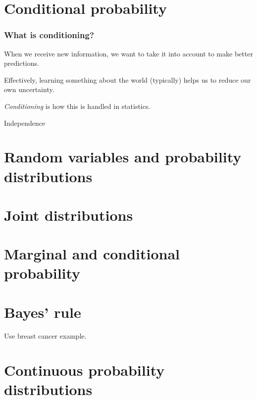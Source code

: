 \documentclass{beamer}
\begin{document}
	\section{Conditional probability}
	\frame{\tableofcontents[currentsection]}
	
	\begin{frame}
		\frametitle{What is conditioning?}
		
		When we receive new information, we want to take it into account to make better predictions.
		
		\vspace{0.5cm}
		
		Effectively, learning something about the world (typically) helps us to reduce our own uncertainty.
		
		\vspace{0.5cm}
		
		\textit{Conditioning} is how this is handled in statistics.
		
	\end{frame}

	\begin{frame}
		Independence
	\end{frame}
	

	\section{Random variables and probability distributions}


	\section{Joint distributions}
	\frame{\tableofcontents[currentsection]}

	\section{Marginal and conditional probability}
	\frame{\tableofcontents[currentsection]}
	
	\section{Bayes' rule}
	\frame{\tableofcontents[currentsection]}
	
	Use breast cancer example.
	
	\section{Continuous probability distributions}
	\frame{\tableofcontents[currentsection]}
	
\end{document}
